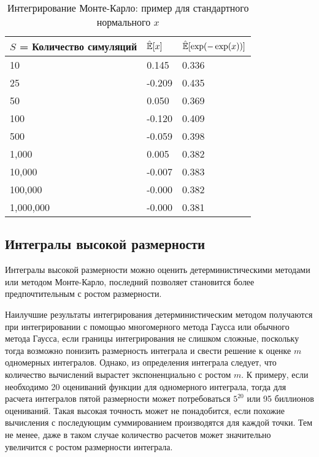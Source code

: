 \begin{table}[h]
\begin{center}
\caption{\label{tab:mcintegral} Интегрирование Монте-Карло: пример для стандартного нормального $x$}
\begin{tabular}{lll}
\hline
\hline
$S$ = Количество симуляций & $\hat{\mathbb{E}}[x]$ & $\hat{\mathbb{E}}[\exp(-\exp(x))]$ \\ 
\hline 
10 & 0.145 & 0.336 \\ 
25 & -0.209 & 0.435 \\ 
50 & 0.050 & 0.369 \\ 
100 & -0.120 & 0.409 \\ 
500 & -0.059 & 0.398 \\ 
1,000 & 0.005 & 0.382 \\ 
10,000 & -0.007 & 0.383 \\ 
100,000 & -0.000 & 0.382 \\ 
1,000,000 & -0.000 & 0.381 \\ 
\hline 
\end{tabular}
\end{center}
\end{table} 

\subsection{Интегралы высокой размерности}

Интегралы высокой размерности можно оценить детерминистическими методами или методом Монте-Карло, последний позволяет становится более предпочтительным с ростом размерности.

Наилучшие результаты интегрирования детерминистическим методом получаются при интегрировании с помощью многомерного метода Гаусса или обычного метода Гаусса, если границы интегрирования не слишком сложные, поскольку тогда возможно понизить размерность интеграла и свести решение к оценке $m$ одномерных интегралов. Однако, из определения интеграла следует, что количество вычислений вырастет экспоненциально с ростом $m$. К примеру, если необходимо 20 оцениваний функции для одномерного интеграла, тогда для расчета интегралов пятой размерности может потребоваться $5^{20}$ или 95 биллионов оцениваний. Такая высокая точность может не понадобится, если похожие вычисления  с последующим суммированием производятся для каждой точки. Тем не менее, даже в таком случае количество расчетов может значительно увеличится с ростом размерности интеграла.

